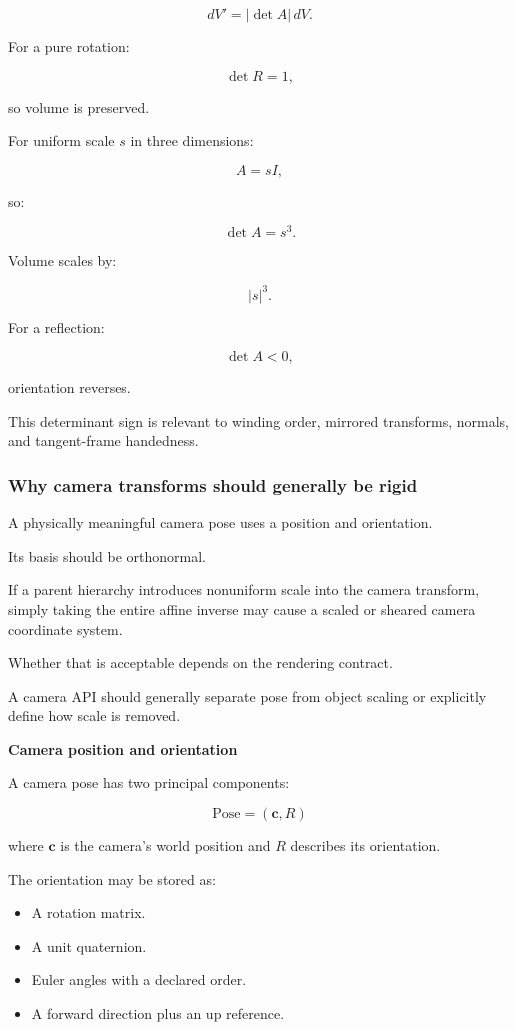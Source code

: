\[
 \boxed{ dV'=|\det A|\,dV }.
\]

For a pure rotation:

\[
 \det R=1,
\]

so volume is preserved.

For uniform scale \(s\) in three dimensions:

\[
 A=sI,
\]

so:

\[
 \det A=s^3.
\]

Volume scales by:

\[
 |s|^3.
\]

For a reflection:

\[
 \det A<0,
\]

orientation reverses.

This determinant sign is relevant to winding order, mirrored transforms, normals, and tangent-frame handedness.

\subsubsection{Why camera transforms should generally be rigid}\label{02-foundations-ii-ch032-why-camera-transforms-should-generally-be-rigid}

\hypertarget{02-foundations-ii-ch032-why-camera-transforms-should-generally-be-rigid}{}

A physically meaningful camera pose uses a position and orientation.

Its basis should be orthonormal.

If a parent hierarchy introduces nonuniform scale into the camera transform, simply taking the entire affine inverse may cause a scaled or sheared camera coordinate system.

Whether that is acceptable depends on the rendering contract.

A camera API should generally separate pose from object scaling or explicitly define how scale is removed.

\textbf{Camera position and orientation}

A camera pose has two principal components:

\[
 \boxed{ \text{Pose}=(\mathbf c,R) }
\]

where \(\mathbf c\) is the camera's world position and \(R\) describes its orientation.

The orientation may be stored as:

\begin{itemize}
\tightlist
\item
  A rotation matrix.
\item
  A unit quaternion.
\item
  Euler angles with a declared order.
\item
  A forward direction plus an up reference.
\end{itemize}

